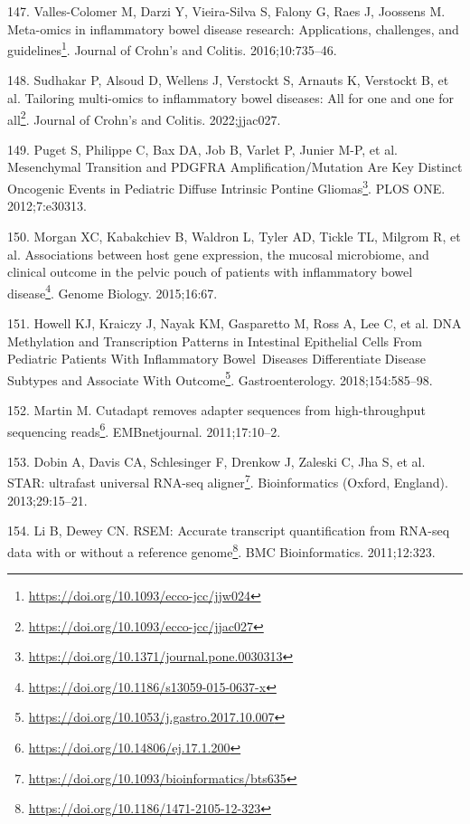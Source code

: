 \documentclass[
  12pt,
  a4paper,
  twoside,
  openright]{book}
\DeclareRobustCommand{\href}[2]{#2\footnote{\url{#1}}}
\newlength{\cslhangindent}
\newlength{\cslentryspacingunit} %
\newenvironment{CSLReferences}[2] %
 {%
  \setlength{\parindent}{0pt}
  \ifodd #1
  \let\oldpar\par
  \def\par{\hangindent=\cslhangindent\oldpar}
  \fi
  \setlength{\parskip}{#2\cslentryspacingunit}
 }%
 {}
\begin{document}
\begin{CSLReferences}{0}{0}
\leavevmode{}%
147. Valles-Colomer M, Darzi Y, Vieira-Silva S, Falony G, Raes J, Joossens M. \href{https://doi.org/10.1093/ecco-jcc/jjw024}{Meta-omics in inflammatory bowel disease research: Applications, challenges, and guidelines}. Journal of Crohn's and Colitis. 2016;10:735--46.

\leavevmode{}%
148. Sudhakar P, Alsoud D, Wellens J, Verstockt S, Arnauts K, Verstockt B, et al. \href{https://doi.org/10.1093/ecco-jcc/jjac027}{Tailoring multi-omics to inflammatory bowel diseases: All for one and one for all}. Journal of Crohn's and Colitis. 2022;jjac027.

\leavevmode{}%
149. Puget S, Philippe C, Bax DA, Job B, Varlet P, Junier M-P, et al. \href{https://doi.org/10.1371/journal.pone.0030313}{Mesenchymal Transition and PDGFRA Amplification/Mutation Are Key Distinct Oncogenic Events in Pediatric Diffuse Intrinsic Pontine Gliomas}. PLOS ONE. 2012;7:e30313.

\leavevmode{}%
150. Morgan XC, Kabakchiev B, Waldron L, Tyler AD, Tickle TL, Milgrom R, et al. \href{https://doi.org/10.1186/s13059-015-0637-x}{Associations between host gene expression, the mucosal microbiome, and clinical outcome in the pelvic pouch of patients with inflammatory bowel disease}. Genome Biology. 2015;16:67.

\leavevmode{}%
151. Howell KJ, Kraiczy J, Nayak KM, Gasparetto M, Ross A, Lee C, et al. \href{https://doi.org/10.1053/j.gastro.2017.10.007}{DNA Methylation and Transcription Patterns in Intestinal Epithelial Cells From Pediatric Patients With Inflammatory Bowel~Diseases Differentiate Disease Subtypes and Associate With Outcome}. Gastroenterology. 2018;154:585--98.

\leavevmode{}%
152. Martin M. \href{https://doi.org/10.14806/ej.17.1.200}{Cutadapt removes adapter sequences from high-throughput sequencing reads}. EMBnetjournal. 2011;17:10--2.

\leavevmode{}%
153. Dobin A, Davis CA, Schlesinger F, Drenkow J, Zaleski C, Jha S, et al. \href{https://doi.org/10.1093/bioinformatics/bts635}{STAR: ultrafast universal RNA-seq aligner}. Bioinformatics (Oxford, England). 2013;29:15--21.

\leavevmode{}%
154. Li B, Dewey CN. \href{https://doi.org/10.1186/1471-2105-12-323}{RSEM: Accurate transcript quantification from RNA-seq data with or without a reference genome}. BMC Bioinformatics. 2011;12:323.


\end{CSLReferences}
\end{document}
